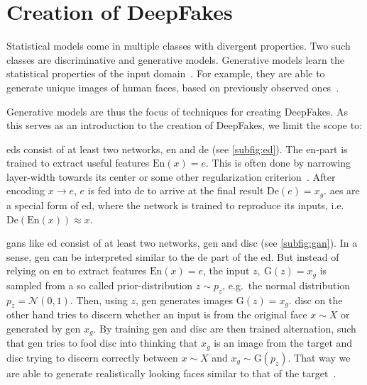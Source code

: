 \section{Creation of DeepFakes}\label{sect:creation-of-deepfakes}
Statistical models come in multiple classes with divergent properties.
Two such classes are discriminative and generative models. Generative models
learn the statistical properties of the input domain~\cite[cf.][\nopp{}651\psqq]{Goodfellow.2016}.
For example, they are able to generate unique images of human faces, based on
previously observed ones~\cite{Karras.2019}.

\par
Generative models are thus the focus of techniques for creating DeepFakes. As
this serves as an introduction to the creation of DeepFakes, we limit the scope
to:
\begin{description}[leftmargin=0cm]
    \item[\glspl{ed}] \glspl{ed} consist of at least two networks, \gls{en} and
    \gls{de} (see \cref{subfig:ed}). The \gls{en}-part is trained to extract
    useful features \(\text{En}(x)=e\). This is often done by narrowing
    layer-width towards its center or some other regularization criterion~\cite[cf.][499-505]{Goodfellow.2016}.
    After encoding \(x \rightarrow e\), \(e\) is fed into \gls{de} to arrive at
    the final result \(\text{De}(e)=x_g\). \Glspl{ae} are a special form of
    \gls{ed}, where the network is trained to reproduce its inputs, i.e.\
    \(\text{De}(\text{En}(x))\approx x\).

    \item[\glspl{gan}] \glspl{gan} like \gls{ed} consist of at least two networks,
    \gls{gen} and \gls{disc} (see \cref{subfig:gan}). In a sense, \gls{gen} can
    be interpreted similar to the \gls{de} part of the \gls{ed}. But instead of
    relying on \gls{en} to extract features \(\text{En}(x)=e\), the input
    \(z,\ \text{G}(z)=x_g\) is sampled from a so called prior-distribution
    \(z\sim p_z\), e.g.\ the normal distribution \(p_z=\mathcal{N}(0, 1)\). Then,
    using \(z\), \gls{gen} generates images \(\text{G}(z)=x_g\). \Gls{disc} on
    the other hand tries to discern whether an input is from the original face
    \(x\sim X\) or generated by \gls{gen} \(x_g\). By training \gls{gen} and
    \gls{disc} are then trained alternation, such that \gls{gen} tries to fool
    \gls{disc} into thinking that \(x_g\) is an image from the target and \gls{disc}
    trying to discern correctly between \(x\sim X\) and \(x_g\sim \text{G}(p_z)\).
    That way we are able to generate realistically looking faces similar to that
    of the target~\cite{Goodfellow.2014}.
\end{description}
